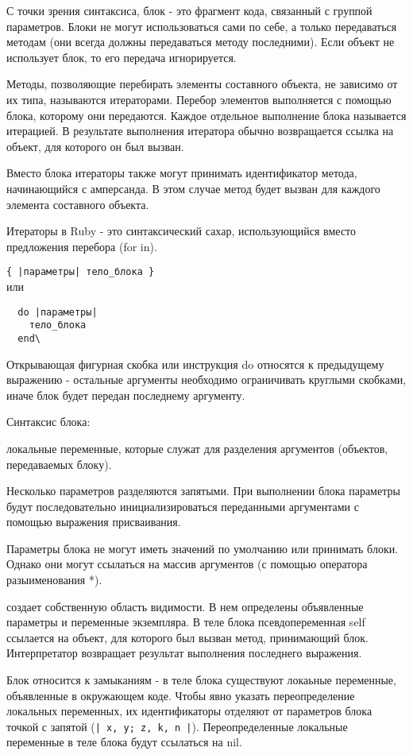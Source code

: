 С точки зрения синтаксиса, блок - это фрагмент кода, связанный с группой параметров. Блоки не могут использоваться сами по себе, а только передаваться методам (они всегда должны передаваться методу последними). Если объект не использует блок, то его передача игнорируется.
\begin{note}
  Методы, позволяющие перебирать элементы составного объекта, не зависимо от их типа, называются итераторами. Перебор элементов выполняется с помощью блока, которому они передаются. Каждое отдельное выполнение блока называется итерацией. В результате выполнения итератора обычно возвращается ссылка на объект, для которого он был вызван.

  Вместо блока итераторы также могут принимать идентификатор метода, начинающийся с амперсанда. В этом случае метод будет вызван для каждого элемента составного объекта.

  Итераторы в Ruby - это синтаксический сахар, использующийся вместо предложения перебора (for in). 
\end{note}
\verb!{ |параметры| тело_блока }!
\\ или
\begin{verbatim}
  do |параметры|
    тело_блока
  end\
\end{verbatim}

Открывающая фигурная скобка или инструкция do относятся к предыдущему выражению - остальные аргументы необходимо ограничивать круглыми скобками, иначе блок будет передан последнему аргументу.

\begin{keylist}{Синтаксис блока:}

   локальные переменные, которые служат для разделения аргументов (объектов, передаваемых блоку).

  Несколько параметров разделяются запятыми. При выполнении блока параметры будут последовательно инициализироваться переданными аргументами с помощью выражения присваивания.

  Параметры блока не могут иметь значений по умолчанию или принимать блоки. Однако они могут ссылаться на массив аргументов (с помощью оператора разыименования *).
  
   создает собственную область видимости. В нем определены объявленные параметры и переменные экземпляра. В теле блока псевдопеременная self ссылается на объект, для которого был вызван метод, принимающий блок. Интерпретатор возвращает результат выполнения последнего выражения.

  Блок относится к замыканиям - в теле блока существуют локаьные переменные, объявленные в окружающем коде. Чтобы явно указать переопределение локальных переменных, их идентификаторы отделяют от параметров блока точкой с запятой (\verb!| x, y; z, k, n |!). Переопределенные локальные переменные в теле блока будут ссылаться на nil.
\end{keylist}

